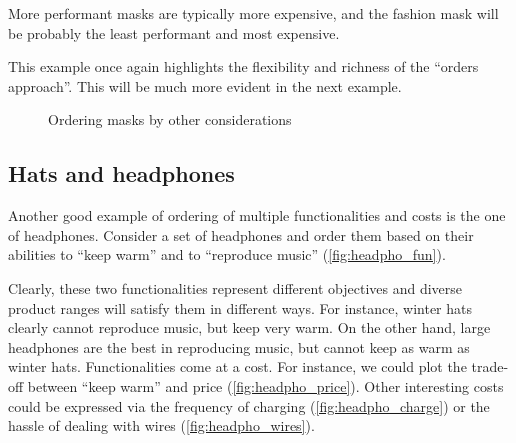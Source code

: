 
More performant masks are typically more expensive, and the fashion mask will be probably the least performant and most expensive.

This example once again highlights the flexibility and richness of the ``orders approach''.
This will be much more evident in the next example.

\vfill
\begin{figure}[h!]
    \caption{Ordering masks by other considerations}
\end{figure}


\clearpage
\subsection{Hats and headphones}
Another good example of ordering of multiple functionalities and costs is the one of headphones.
Consider a set of headphones and order them based on their abilities to ``keep warm'' and to ``reproduce music'' (\cref{fig:headpho_fun}).


Clearly, these two functionalities represent different objectives and diverse product ranges will satisfy them in different ways.
For instance, winter hats clearly cannot reproduce music, but keep very warm.
On the other hand, large headphones are the best in reproducing music, but cannot keep as warm as winter hats.
Functionalities come at a cost.
For instance, we could plot the trade-off between ``keep warm'' and price (\cref{fig:headpho_price}).
Other interesting costs could be expressed via the frequency of charging (\cref{fig:headpho_charge}) or the hassle of dealing with wires (\cref{fig:headpho_wires}).

